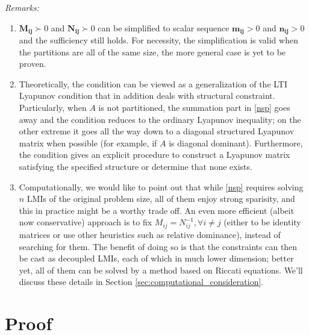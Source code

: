 \documentclass{article}
\begin{document}
\emph{Remarks:}
\begin{enumerate}
  \item $\pmb{M_{ij}}\succ0$ and $\pmb{N_{ij}}\succ0$ can be simplified to scalar sequence $\pmb{m_{ij}}>0$ and $\pmb{n_{ij}}>0$ and the sufficiency still holds. For necessity, the simplification is valid when the partitions are all of the same size, the more general case is yet to be proven. 

  \item Theoretically, the condition can be viewed as a generalization of the LTI Lyapunov condition that in addition deals with structural constraint. Particularly, when $A$ is not partitioned, the summation part in \eqref{nsp} goes away and the condition reduces to the ordinary Lyapunov inequality; on the other extreme it goes all the way down to a diagonal structured Lyapunov matrix when possible (for example, if $A$ is diagonal dominant). Furthermore, the condition gives an explicit procedure to construct a Lyapunov matrix satisfying the specified structure or determine that none exists.

  \item Computationally, we would like to point out that while \eqref{nsp} requires solving $n$ LMIs of the original problem size, all of them enjoy strong sparisity, and this in practice might be a worthy trade off. An even more efficient (albeit now conservative) approach is to fix $M_{ij}=N_{ij}^{-1}, \forall i\neq j$ (either to be identity matrices or use other heuristics such as relative dominance), instead of searching for them. The benefit of doing so is that the constraints can then be cast as decoupled LMIs, each of which in much lower dimension; better yet, all of them can be solved by a method based on Riccati equations. We'll discuss these details in Section \ref{sec:computational_consideration}.
\end{enumerate}



\section{Proof}\label{necessity}

\end{document}
